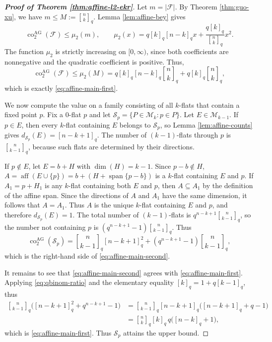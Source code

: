 \documentclass[11pt]{article}
\theoremstyle{definition}
\newcommand{\qbinom}[2]{\genfrac{[}{]}{0pt}{}{#1}{#2}_q}
\newcommand{\Span}{\operatorname{span}}
\newcommand{\aff}{\operatorname{aff}}
\begin{document}
\vskip 3mm
\begin{proof}[\bfseries{Proof of Theorem \ref{thm:affine-l2-ekr}}]
Let $m=|\mathcal F|$. By Theorem \ref{thm:guo-xu}, we have $m\le M:=\qbinom{n}{k}$. Lemma \ref{lem:affine-bey} gives
\[
\operatorname{co}^{\mathrm{AG}}_2(\mathcal F)\le \mu_2(m),
\qquad
\mu_2(x)=q[k]_q[n-k]_qx+\frac{q[k]_q}{\qbinom{n}{k}}x^2.
\]
The function $\mu_2$ is strictly increasing on $[0,\infty)$, since both coefficients are nonnegative and the quadratic coefficient is positive.  Thus,
\[
\operatorname{co}^{\mathrm{AG}}_2(\mathcal F)
\le \mu_2(M)
=q[k]_q[n-k]_q\qbinom{n}{k}+q[k]_q\qbinom{n}{k},
\]
which is exactly \eqref{eq:affine-main-first}.

We now compute the value on a family consisting of all $k$-flats that contain a fixed point $p$.  Fix a $0$-flat $p$ and let $\mathcal S_p=\{P\in\mathcal M_k:p\in P\}$. Let $E\in\mathcal M_{k-1}$.  If $p\in E$, then every $k$-flat containing $E$ belongs to $\mathcal S_p$, so Lemma \ref{lem:affine-counts} gives $d_{\mathcal S_p}(E)=[n-k+1]_q$. The number of $(k-1)$-flats through $p$ is $\qbinom{n}{k-1}$, because such flats are determined by their directions.

If $p\notin E$, let $E=b+H$ with $\dim(H)=k-1$. Since $p-b\notin H$, $A=\aff(E\cup\{p\})=b+(H+\Span\{p-b\})$ is a $k$-flat containing $E$ and $p$. If $A_1=p+H_1$ is any $k$-flat containing both $E$ and $p$, then $A\subseteq A_1$ by the definition of the affine span. Since the directions of $A$ and $A_1$ have the same dimension, it follows that $A=A_1$. Thus $A$ is the unique $k$-flat containing $E$ and $p$, and therefore $d_{\mathcal S_p}(E)=1$. The total number of $(k-1)$-flats is $q^{n-k+1}\qbinom{n}{k-1}$, so the number not containing $p$ is $(q^{n-k+1}-1)\qbinom{n}{k-1}$. Thus
\begin{equation}\label{eq:affine-pencil-codegree}
\operatorname{co}^{\mathrm{AG}}_2(\mathcal S_p)
=\qbinom{n}{k-1}[n-k+1]_q^2
+(q^{n-k+1}-1)\qbinom{n}{k-1},
\end{equation}
which is the right-hand side of \eqref{eq:affine-main-second}.

It remains to see that \eqref{eq:affine-main-second} agrees with \eqref{eq:affine-main-first}. Applying \eqref{eq:qbinom-ratio} and the elementary equality $[k]_q=1+q[k-1]_q$, thus
\[
\begin{aligned}
\qbinom{n}{k-1}\bigl([n-k+1]_q^2+q^{n-k+1}-1\bigr)
&=\qbinom{n}{k-1}[n-k+1]_q\bigl([n-k+1]_q+q-1\bigr)\\
&=\qbinom{n}{k}[k]_q\,q\bigl([n-k]_q+1\bigr),
\end{aligned}
\]
which is \eqref{eq:affine-main-first}.  Thus $\mathcal S_p$ attains the upper bound.


\end{proof}
\end{document}
